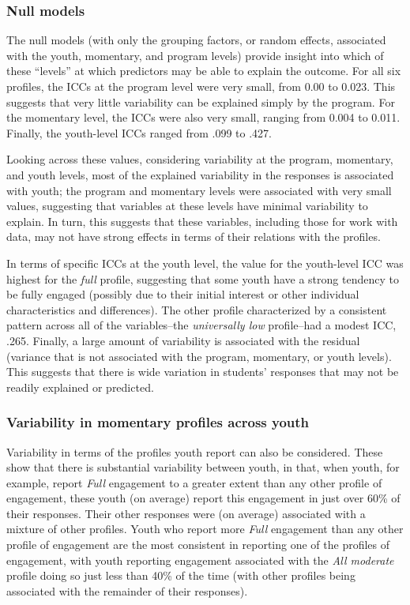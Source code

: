 \documentclass[]{msu-thesis}
\theoremstyle{definition}
\theoremstyle{definition}
\theoremstyle{definition}
\theoremstyle{remark}
\begin{document}
\subsubsection{Null models}\label{null-models}

The null models (with only the grouping factors, or random effects,
associated with the youth, momentary, and program levels) provide
insight into which of these ``levels'' at which predictors may be able
to explain the outcome. For all six profiles, the ICCs at the program
level were very small, from 0.00 to 0.023. This suggests that very
little variability can be explained simply by the program. For the
momentary level, the ICCs were also very small, ranging from 0.004 to
0.011. Finally, the youth-level ICCs ranged from .099 to .427.

Looking across these values, considering variability at the program,
momentary, and youth levels, most of the explained variability in the
responses is associated with youth; the program and momentary levels
were associated with very small values, suggesting that variables at
these levels have minimal variability to explain. In turn, this suggests
that these variables, including those for work with data, may not have
strong effects in terms of their relations with the profiles.

In terms of specific ICCs at the youth level, the value for the
youth-level ICC was highest for the \emph{full} profile, suggesting that
some youth have a strong tendency to be fully engaged (possibly due to
their initial interest or other individual characteristics and
differences). The other profile characterized by a consistent pattern
across all of the variables--the \emph{universally low} profile--had a
modest ICC, .265. Finally, a large amount of variability is associated
with the residual (variance that is not associated with the program,
momentary, or youth levels). This suggests that there is wide variation
in students' responses that may not be readily explained or predicted.

\subsubsection{Variability in momentary profiles across
youth}\label{variability-in-momentary-profiles-across-youth}

Variability in terms of the profiles youth report can also be
considered. These show that there is substantial variability between
youth, in that, when youth, for example, report \emph{Full} engagement
to a greater extent than any other profile of engagement, these youth
(on average) report this engagement in just over 60\% of their
responses. Their other responses were (on average) associated with a
mixture of other profiles. Youth who report more \emph{Full} engagement
than any other profile of engagement are the most consistent in
reporting one of the profiles of engagement, with youth reporting
engagement associated with the \emph{All moderate} profile doing so just
less than 40\% of the time (with other profiles being associated with
the remainder of their responses).
\end{document}
